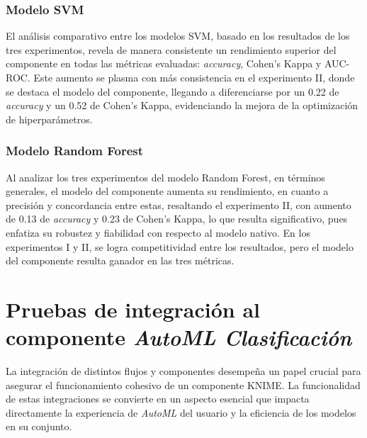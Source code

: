 \subsubsection*{Modelo SVM}
El análisis comparativo entre los modelos SVM, basado en los resultados de los tres experimentos, revela de manera consistente un rendimiento superior del componente en todas las métricas evaluadas: \textit{accuracy}, Cohen's Kappa y AUC-ROC. Este aumento se plasma con más consistencia en el experimento II, donde se destaca el modelo del componente, llegando a diferenciarse por un 0.22 de \textit{accuracy} y un 0.52 de Cohen's Kappa, evidenciando la mejora de la optimización de hiperparámetros.

\subsubsection*{Modelo Random Forest}
Al analizar los tres experimentos del modelo Random Forest, en términos generales, el modelo del componente aumenta su rendimiento, en cuanto a precisión y concordancia entre estas, resaltando el experimento II, con aumento de 0.13 de \textit{accuracy} y 0.23 de Cohen's Kappa, lo que resulta significativo, pues enfatiza su robustez y fiabilidad con respecto al modelo nativo. En los experimentos I y II, se logra competitividad entre los resultados, pero el modelo del componente resulta ganador en las tres métricas.


\section{Pruebas de integración al componente \textit{AutoML Clasificación}}

La integración de distintos flujos y componentes desempeña un papel crucial para asegurar el funcionamiento cohesivo de un componente KNIME. La funcionalidad de estas integraciones se convierte en un aspecto esencial que impacta directamente la experiencia de \textit{AutoML} del usuario y la eficiencia de los modelos en su conjunto. 

